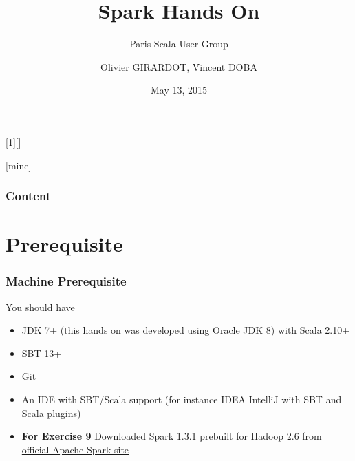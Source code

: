 \documentclass[slidetop,9pt,utf8]{beamer}
\begin{document}
\begin{CJK}{UTF8}{gbsn}

\AtBeginSection{\frame{\sectionpage}}

[1][]{%
}

[mine]

%
%
%
%


\title[Spark Hands On (PSUG)]{Spark Hands On}
\subtitle{Paris Scala User Group}
\author{Olivier GIRARDOT, Vincent DOBA}
\date{May 13, 2015}

\frame{\titlepage}

\begin{frame}[allowframebreaks]
  \frametitle{Content}
  \tableofcontents[hideallsubsections]
\end{frame}

\section{Prerequisite}

\begin{frame}
  \frametitle{Machine Prerequisite}

  \begin{block}{You should have}
    \begin{itemize}
      \item JDK 7+ (this hands on was developed using Oracle JDK 8) with Scala 2.10+
      \item SBT 13+
      \item Git
      \item An IDE with SBT/Scala support (for instance IDEA IntelliJ with SBT and Scala plugins)
      \item \textbf{For Exercise 9} Downloaded Spark 1.3.1 prebuilt for Hadoop 2.6 from \href{http://www.apache.org/dyn/closer.cgi/spark/spark-1.3.1/spark-1.3.1-bin-hadoop2.6.tgz}{official Apache Spark site}
    \end{itemize}
  \end{block}


\end{frame}
\end{CJK}
\end{document}
